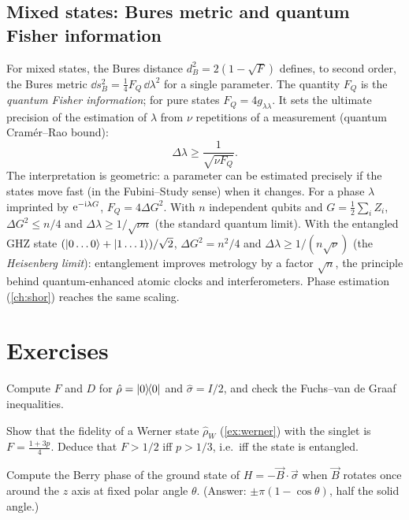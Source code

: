 \subsection{Mixed states: Bures metric and quantum Fisher information}
For mixed states, the Bures distance $d_B^2=2(1-\sqrt F)$ defines, to second order, the Bures metric $\dd s_B^2=\frac14F_Q\,\dd\lambda^2$ for a single parameter. The quantity $F_Q$ is the \emph{quantum Fisher information}; for pure states $F_Q=4g_{\lambda\lambda}$.
It sets the ultimate precision of the estimation of $\lambda$ from $\nu$ repetitions of a measurement (quantum Cramér--Rao bound):
\begin{equation}
  \Delta\lambda\ge\frac1{\sqrt{\nu F_Q}} .
\end{equation}
The interpretation is geometric: a parameter can be estimated precisely if the states move fast (in the Fubini--Study sense) when it changes. For a phase $\lambda$ imprinted by $\mathrm e^{-\mathrm i\lambda G}$, $F_Q=4\Delta G^2$. With $n$ independent qubits and
$G=\frac12\sum_iZ_i$, $\Delta G^2\le n/4$ and $\Delta\lambda\ge1/\sqrt{\nu n}$ (the standard quantum limit). With the entangled GHZ state $(\left|0\dots0\right\rangle+\left|1\dots1\right\rangle)/\sqrt2$, $\Delta G^2=n^2/4$ and $\Delta\lambda\ge1/(n\sqrt\nu)$ (the
\emph{Heisenberg limit}): entanglement improves metrology by a factor $\sqrt n$, the principle behind quantum-enhanced atomic clocks and interferometers. Phase estimation (\cref{ch:shor}) reaches the same scaling.

\section{Exercises}
\begin{exercise}
Compute $F$ and $D$ for $\hat\rho=\left|0\middle\rangle\!\middle\langle0\right|$ and $\hat\sigma=I/2$, and check the Fuchs--van de Graaf inequalities.
\end{exercise}
\begin{exercise}
Show that the fidelity of a Werner state $\hat\rho_W$ (\cref{ex:werner}) with the singlet is $F=\frac{1+3p}4$. Deduce that $F>1/2$ iff $p>1/3$, i.e.\ iff the state is entangled.
\end{exercise}
\begin{exercise}
Compute the Berry phase of the ground state of $H=-\vec B\cdot\vec\sigma$ when $\vec B$ rotates once around the $z$ axis at fixed polar angle $\theta$. (Answer: $\pm\pi(1-\cos\theta)$, half the solid angle.)
\end{exercise}
